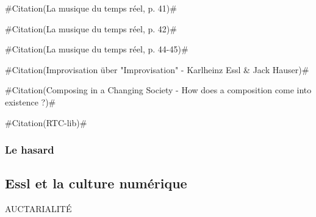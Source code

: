 \documentclass[a4paper,12pt]{article}
\newcommand{\zitat}[2]{\#Citation(#2)\#}
\begin{document}
\zitat{Mais le temps réel est une notion technologique avant d'être une notion musicale. C'est en fait une illusion. Le temps réel n'existe jamais dans la réalité technologique parce qu'une machine met toujours un certain temps, même si celui-ci est extrêmement bref, pour effectuer ses calculs.}
{La musique du temps réel, p. 41}

\zitat{En musique, on parle de temps réel à partir du moment où le laps de temps entre le début du calcul et la livraison du résultat d'une opération informatique est suffisamment bref pour ne pas être perçu.}
{La musique du temps réel, p. 42}

\zitat{Le grand avantage du temps réel, ce n'est pas un gain de temps pour le compositeur --- au contraire cela représente une difficulté supplémentaire à maîtriser --- mais c'est qu'il intègre l'interprétation dans la musique électronique ; auparavant ces deux domaines restaient étrangers l'un à l'autre.}
{La musique du temps réel, p. 44-45}

\zitat{Weil man sich beim Improvisieren nicht (wie beim Komponieren) "out of time" befindet, sondern mitten im Zeitablauf steckt, entstehen aus dieser Verantwortung und aus diesem Zwang heraus Situationen, die man als Komponist am Schreibtisch nicht planen kann.}
{Improvisation über "Improvisation" - Karlheinz Essl \& Jack Hauser}

\zitat{My formal thinking takes place in a bipolar field of tension, namely that between work and process. (…) For me, the most captivating aspect of composing is the reconciliation of these opposites, though each time in a different way.}
{Composing in a Changing Society - How does a composition come into existence ?}

\zitat{I immediately felt in love with it for it offered the possibility of realtime processing and interactivity. (In LOGO, it took many hours to calculate a score list which I had to transcribe into of musical notation in order to analyze it - a very time-consuming procedure).}
{RTC-lib}

\subsubsection{Le hasard}


\subsection{Essl et la culture numérique}

AUCTARIALITÉ
\end{document}
